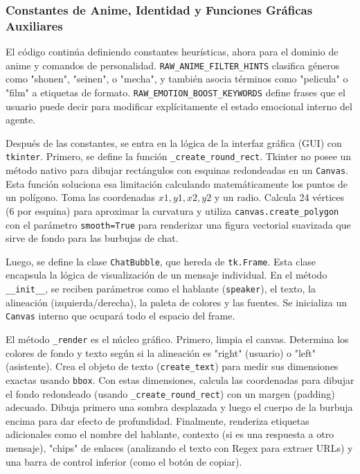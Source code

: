 \documentclass[letterpaper,12pt]{article}
\begin{document}
\subsubsection{Constantes de Anime, Identidad y Funciones Gráficas Auxiliares}

El código continúa definiendo constantes heurísticas, ahora para el dominio de anime y comandos de personalidad. \texttt{RAW\_ANIME\_FILTER\_HINTS} clasifica géneros como "shonen", "seinen", o "mecha", y también asocia términos como "pelicula" o "film" a etiquetas de formato. \texttt{RAW\_EMOTION\_BOOST\_KEYWORDS} define frases que el usuario puede decir para modificar explícitamente el estado emocional interno del agente.

Después de las constantes, se entra en la lógica de la interfaz gráfica (GUI) con \texttt{tkinter}. Primero, se define la función \texttt{\_create\_round\_rect}. Tkinter no posee un método nativo para dibujar rectángulos con esquinas redondeadas en un \texttt{Canvas}. Esta función soluciona esa limitación calculando matemáticamente los puntos de un polígono. Toma las coordenadas $x1, y1, x2, y2$ y un radio. Calcula 24 vértices (6 por esquina) para aproximar la curvatura y utiliza \texttt{canvas.create\_polygon} con el parámetro \texttt{smooth=True} para renderizar una figura vectorial suavizada que sirve de fondo para las burbujas de chat.

Luego, se define la clase \texttt{ChatBubble}, que hereda de \texttt{tk.Frame}. Esta clase encapsula la lógica de visualización de un mensaje individual.
En el método \texttt{\_\_init\_\_}, se reciben parámetros como el hablante (\texttt{speaker}), el texto, la alineación (izquierda/derecha), la paleta de colores y las fuentes. Se inicializa un \texttt{Canvas} interno que ocupará todo el espacio del frame.

El método \texttt{\_render} es el núcleo gráfico. Primero, limpia el canvas. Determina los colores de fondo y texto según si la alineación es "right" (usuario) o "left" (asistente). Crea el objeto de texto (\texttt{create\_text}) para medir sus dimensiones exactas usando \texttt{bbox}. Con estas dimensiones, calcula las coordenadas para dibujar el fondo redondeado (usando \texttt{\_create\_round\_rect}) con un margen (padding) adecuado. Dibuja primero una sombra desplazada y luego el cuerpo de la burbuja encima para dar efecto de profundidad. Finalmente, renderiza etiquetas adicionales como el nombre del hablante, contexto (si es una respuesta a otro mensaje), "chips" de enlaces (analizando el texto con Regex para extraer URLs) y una barra de control inferior (como el botón de copiar).
\end{document}
